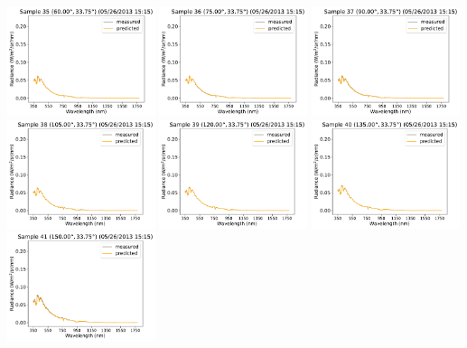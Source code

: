 \begin{center}
\includegraphics[width=0.325\textwidth]{img/05261515_s35.pdf}
\includegraphics[width=0.325\textwidth]{img/05261515_s36.pdf}
\includegraphics[width=0.325\textwidth]{img/05261515_s37.pdf}\\
\includegraphics[width=0.325\textwidth]{img/05261515_s38.pdf}
\includegraphics[width=0.325\textwidth]{img/05261515_s39.pdf}
\includegraphics[width=0.325\textwidth]{img/05261515_s40.pdf}\\
\includegraphics[width=0.325\textwidth]{img/05261515_s41.pdf}

\end{center}

